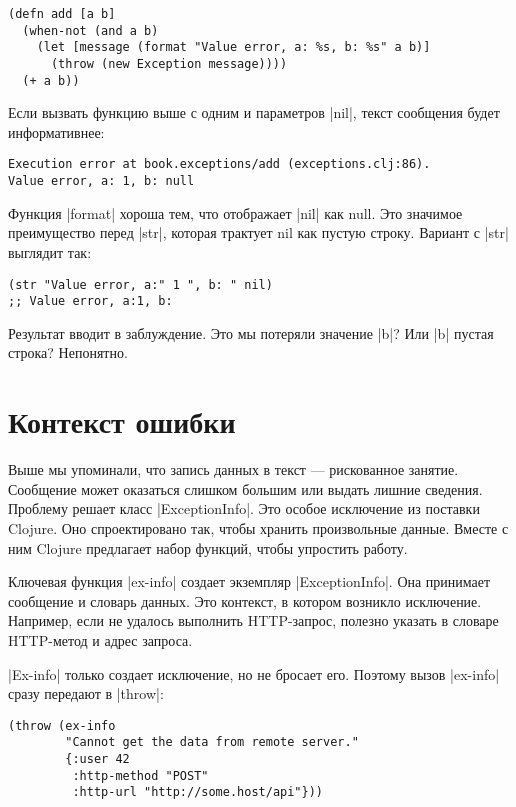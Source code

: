 \begin{verbatim}
(defn add [a b]
  (when-not (and a b)
    (let [message (format "Value error, a: %s, b: %s" a b)]
      (throw (new Exception message))))
  (+ a b))
\end{verbatim}

Если вызвать функцию выше с одним и параметров \spverb|nil|, текст сообщения будет
информативнее:

\begin{verbatim}
Execution error at book.exceptions/add (exceptions.clj:86).
Value error, a: 1, b: null
\end{verbatim}

Функция \spverb|format| хороша тем, что отображает \spverb|nil| как null. Это значимое
преимущество перед \spverb|str|, которая трактует nil как пустую строку. Вариант с
\spverb|str| выглядит так:

\begin{verbatim}
(str "Value error, a:" 1 ", b: " nil)
;; Value error, a:1, b:
\end{verbatim}

Результат вводит в заблуждение. Это мы потеряли значение \spverb|b|? Или \spverb|b| пустая
строка? Непонятно.

\section{Контекст ошибки}

Выше мы упоминали, что запись данных в текст — рискованное занятие. Сообщение
может оказаться слишком большим или выдать лишние сведения. Проблему решает
класс \spverb|ExceptionInfo|. Это особое исключение из поставки Clojure. Оно
спроектировано так, чтобы хранить произвольные данные. Вместе с ним Clojure
предлагает набор функций, чтобы упростить работу.

Ключевая функция \spverb|ex-info| создает экземпляр \spverb|ExceptionInfo|. Она принимает
сообщение и словарь данных. Это контекст, в котором возникло
исключение. Например, если не удалось выполнить HTTP-запрос, полезно указать в
словаре HTTP-метод и адрес запроса.

\spverb|Ex-info| только создает исключение, но не бросает его. Поэтому вызов \spverb|ex-info|
сразу передают в \spverb|throw|:

\begin{verbatim}
(throw (ex-info
        "Cannot get the data from remote server."
        {:user 42
         :http-method "POST"
         :http-url "http://some.host/api"}))
\end{verbatim}

